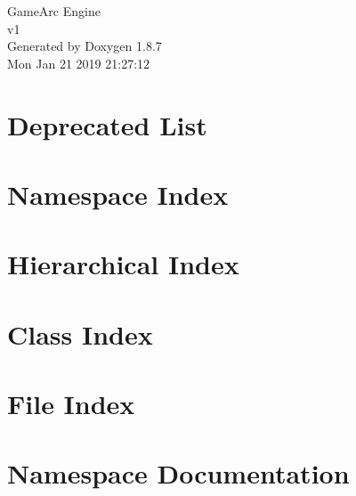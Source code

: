 \documentclass[twoside]{book}
\newcommand{\+}{\discretionary{\mbox{\scriptsize$\hookleftarrow$}}{}{}}
\newcommand{\clearemptydoublepage}{%
  \newpage{\pagestyle{empty}\cleardoublepage}%
}
\begin{document}
\hypersetup{pageanchor=false,
             bookmarks=true,
             bookmarksnumbered=true,
             pdfencoding=unicode
            }
\begin{titlepage}
\vspace*{7cm}
\begin{center}%
{\Large Game\+Arc Engine \\[1ex]\large v1 }\\
\vspace*{1cm}
{\large Generated by Doxygen 1.8.7}\\
\vspace*{0.5cm}
{\small Mon Jan 21 2019 21:27:12}\\
\end{center}
\end{titlepage}
\clearemptydoublepage
\tableofcontents
\clearemptydoublepage
{}
\hypersetup{pageanchor=true}

\chapter{Deprecated List}
\label{deprecated}
\hypertarget{deprecated}{}

\chapter{Namespace Index}

\chapter{Hierarchical Index}

\chapter{Class Index}

\chapter{File Index}

\chapter{Namespace Documentation}

\end{document}
